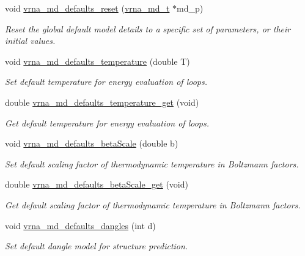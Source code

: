 \begin{DoxyCompactItemize}
void \mbox{\hyperlink{group__model__details_ga70834424cf804d149937de89f80ceb45}{vrna\+\_\+md\+\_\+defaults\+\_\+reset}} (\mbox{\hyperlink{group__model__details_ga1f8a10e12a0a1915f2a4eff0b28ea17c}{vrna\+\_\+md\+\_\+t}} $\ast$md\+\_\+p)
\begin{DoxyCompactList}\small\item\em Reset the global default model details to a specific set of parameters, or their initial values. \end{DoxyCompactList}\item 
void \mbox{\hyperlink{group__model__details_gaf9e527e9a2f7e6fd6e42bc6e602f5445}{vrna\+\_\+md\+\_\+defaults\+\_\+temperature}} (double T)
\begin{DoxyCompactList}\small\item\em Set default temperature for energy evaluation of loops. \end{DoxyCompactList}\item 
double \mbox{\hyperlink{group__model__details_ga96b24a74437f9ba46c4e06343155bf46}{vrna\+\_\+md\+\_\+defaults\+\_\+temperature\+\_\+get}} (void)
\begin{DoxyCompactList}\small\item\em Get default temperature for energy evaluation of loops. \end{DoxyCompactList}\item 
void \mbox{\hyperlink{group__model__details_gae984567db36c3f9b8731ecc917abf3a2}{vrna\+\_\+md\+\_\+defaults\+\_\+beta\+Scale}} (double b)
\begin{DoxyCompactList}\small\item\em Set default scaling factor of thermodynamic temperature in Boltzmann factors. \end{DoxyCompactList}\item 
double \mbox{\hyperlink{group__model__details_gabb8780f5410c52f970d75b044059bd09}{vrna\+\_\+md\+\_\+defaults\+\_\+beta\+Scale\+\_\+get}} (void)
\begin{DoxyCompactList}\small\item\em Get default scaling factor of thermodynamic temperature in Boltzmann factors. \end{DoxyCompactList}\item 
void \mbox{\hyperlink{group__model__details_gac76a5374def8e5e4e644ff6e4cc72dee}{vrna\+\_\+md\+\_\+defaults\+\_\+dangles}} (int d)
\begin{DoxyCompactList}\small\item\em Set default dangle model for structure prediction. \end{DoxyCompactList}\item 

\end{DoxyCompactItemize}
